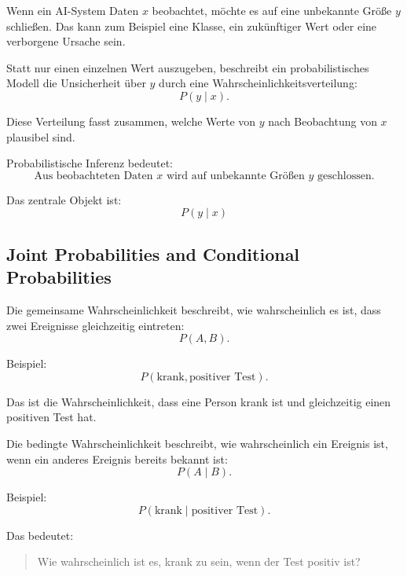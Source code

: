 \documentclass[11pt,a4paper]{scrartcl}
\begin{document}
\begin{solutionbox}
    Wenn ein AI-System Daten \(x\) beobachtet, möchte es auf eine unbekannte
    Größe \(y\) schließen. Das kann zum Beispiel eine Klasse, ein zukünftiger
    Wert oder eine verborgene Ursache sein.

    Statt nur einen einzelnen Wert auszugeben, beschreibt ein probabilistisches
    Modell die Unsicherheit über \(y\) durch eine Wahrscheinlichkeitsverteilung:
    \[
        P(y \mid x).
    \]

    Diese Verteilung fasst zusammen, welche Werte von \(y\) nach Beobachtung von
    \(x\) plausibel sind.
\end{solutionbox}

\begin{answerbox}
    Probabilistische Inferenz bedeutet:
    \[
        \boxed{
            \text{Aus beobachteten Daten } x
            \text{ wird auf unbekannte Größen } y \text{ geschlossen.}
        }
    \]

    Das zentrale Objekt ist:
    \[
        \boxed{
            P(y \mid x)
        }
    \]
\end{answerbox}

\subsection{Joint Probabilities and Conditional Probabilities}

\begin{notebox}
    Die gemeinsame Wahrscheinlichkeit beschreibt, wie wahrscheinlich es ist,
    dass zwei Ereignisse gleichzeitig eintreten:
    \[
        P(A,B).
    \]

    Beispiel:
    \[
        P(\text{krank}, \text{positiver Test}).
    \]

    Das ist die Wahrscheinlichkeit, dass eine Person krank ist und gleichzeitig
    einen positiven Test hat.
\end{notebox}

\begin{notebox}
    Die bedingte Wahrscheinlichkeit beschreibt, wie wahrscheinlich ein Ereignis
    ist, wenn ein anderes Ereignis bereits bekannt ist:
    \[
        P(A \mid B).
    \]

    Beispiel:
    \[
        P(\text{krank} \mid \text{positiver Test}).
    \]

    Das bedeutet:
    \begin{quote}
        Wie wahrscheinlich ist es, krank zu sein, wenn der Test positiv ist?
    \end{quote}
\end{notebox}
\end{document}
